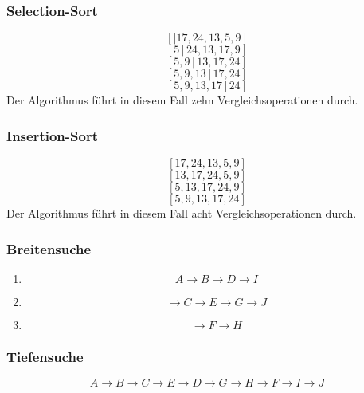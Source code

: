 \documentclass[a4paper, 12pt, margins=3cm]{homework}
\begin{document}
  \begin{problem}

  \end{problem}
  \begin{solution}\hfill
    \subsubsection*{Selection-Sort}
      \[ [|17, 24, 13, 5, 9] \]
      \[ [5\,|\, 24, 13, 17, 9] \]
      \[ [5, 9\,|\, 13, 17, 24] \]
      \[ [5, 9, 13\,|\, 17, 24] \]
      \[ [5, 9, 13, 17\,|\, 24] \]
      Der Algorithmus führt in diesem Fall zehn Vergleichsoperationen durch.

    \subsubsection*{Insertion-Sort}
      \[ [17, 24, 13, 5, 9] \]
      \[ [13, 17, 24, 5, 9] \]
      \[ [5, 13, 17, 24, 9] \]
      \[ [5, 9, 13, 17, 24] \]
      Der Algorithmus führt in diesem Fall acht Vergleichsoperationen durch.

  \end{solution}


  \begin{problem}
    
  \end{problem}
  \begin{solution}\hfill

    \subsubsection*{Breitensuche}
      \begin{enumerate}
        \item \[ A\rightarrow B\rightarrow D\rightarrow I \]
        \item \[ \rightarrow C\rightarrow E\rightarrow G\rightarrow J \]
        \item \[ \rightarrow F\rightarrow H \]
      \end{enumerate}

    \subsubsection*{Tiefensuche}
        \[ A\rightarrow B\rightarrow C\rightarrow E\rightarrow D\rightarrow G\rightarrow H\rightarrow
                 F\rightarrow I\rightarrow J \]

  \end{solution}
\end{document}
